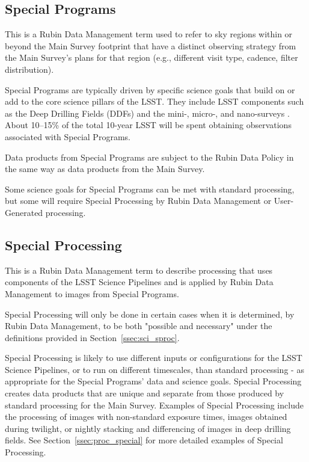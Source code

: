 \subsection{Special Programs} 

This is a Rubin Data Management term used to refer to sky regions within
or beyond the Main Survey footprint that have a distinct observing strategy from
the Main Survey's plans for that region (e.g., different visit type, cadence, filter distribution).

Special Programs are typically driven by specific science goals that build on or 
add to the core science pillars of the LSST.
They include LSST components such as the Deep Drilling 
Fields (DDFs) and the mini-, micro-, and nano-surveys .
About 10--15\% of the total 10-year LSST will be spent obtaining 
observations associated with Special Programs.

Data products from Special Programs are subject to the Rubin Data Policy 
in the same way as data products from the Main Survey.

Some science goals for Special Programs can be met with standard processing,
but some will require Special Processing by Rubin Data Management or User-Generated processing.

\subsection{Special Processing}

This is a Rubin Data Management term to describe processing that 
uses components of the LSST Science Pipelines and is applied by Rubin
Data Management to images from Special Programs.

Special Processing will only be done in certain cases when it
is determined, by Rubin Data Management, to be both "possible and necessary"
under the definitions provided in Section~\ref{ssec:sci_sproc}.

Special Processing is likely to use different inputs or configurations for the
LSST Science Pipelines, or to run on different timescales, than standard processing - 
as appropriate for the Special Programs' data and science goals.
Special Processing creates data products that are unique and separate from those produced
by standard processing for the Main Survey.
Examples of Special Processing include the processing
of images with non-standard exposure times, images obtained
during twilight, or nightly stacking and differencing
of images in deep drilling fields.
See Section~\ref{ssec:proc_special} for more detailed examples of Special Processing.

